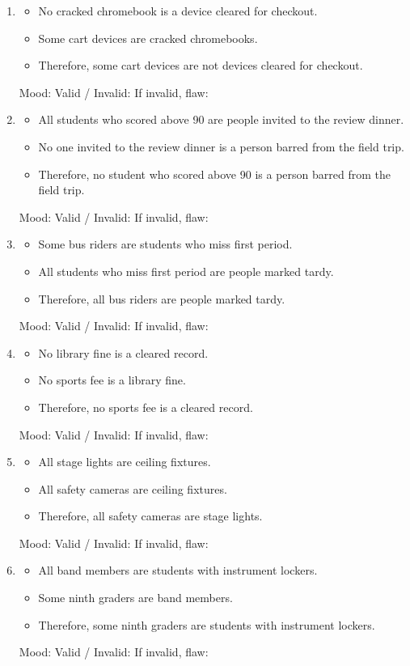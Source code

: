 \documentclass[11pt]{article}
\newcommand{\syllblock}[3]{%
\begin{itemize}[leftmargin=1.2em]
\item #1
\item #2
\item #3
\end{itemize}
}
\begin{document}
\begin{enumerate}[itemsep=0.45em, parsep=0.15em, topsep=0.3em]
\item
\syllblock
{No cracked chromebook is a device cleared for checkout.}
{Some cart devices are cracked chromebooks.}
{Therefore, some cart devices are not devices cleared for checkout.}
Mood: \underline{\hspace{0.9in}}
Valid / Invalid: \underline{\hspace{1.0in}}
If invalid, flaw: \underline{\hspace{3.2in}}

\item
\syllblock
{All students who scored above 90 are people invited to the review dinner.}
{No one invited to the review dinner is a person barred from the field trip.}
{Therefore, no student who scored above 90 is a person barred from the field trip.}
Mood: \underline{\hspace{0.9in}}
Valid / Invalid: \underline{\hspace{1.0in}}
If invalid, flaw: \underline{\hspace{3.2in}}

\item
\syllblock
{Some bus riders are students who miss first period.}
{All students who miss first period are people marked tardy.}
{Therefore, all bus riders are people marked tardy.}
Mood: \underline{\hspace{0.9in}}
Valid / Invalid: \underline{\hspace{1.0in}}
If invalid, flaw: \underline{\hspace{3.2in}}

\item
\syllblock
{No library fine is a cleared record.}
{No sports fee is a library fine.}
{Therefore, no sports fee is a cleared record.}
Mood: \underline{\hspace{0.9in}}
Valid / Invalid: \underline{\hspace{1.0in}}
If invalid, flaw: \underline{\hspace{3.2in}}

\item
\syllblock
{All stage lights are ceiling fixtures.}
{All safety cameras are ceiling fixtures.}
{Therefore, all safety cameras are stage lights.}
Mood: \underline{\hspace{0.9in}}
Valid / Invalid: \underline{\hspace{1.0in}}
If invalid, flaw: \underline{\hspace{3.2in}}

\item
\syllblock
{All band members are students with instrument lockers.}
{Some ninth graders are band members.}
{Therefore, some ninth graders are students with instrument lockers.}
Mood: \underline{\hspace{0.9in}}
Valid / Invalid: \underline{\hspace{1.0in}}
If invalid, flaw: \underline{\hspace{3.2in}}
\end{enumerate}
\end{document}

